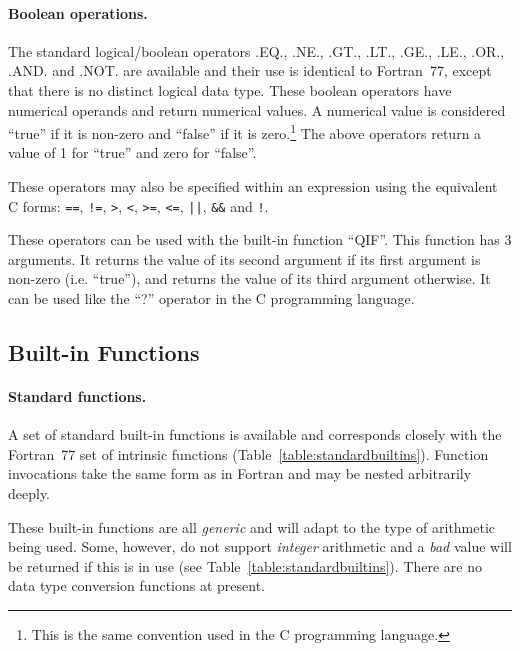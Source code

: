 \documentclass[twoside,11pt]{article}
\newcommand{\xlabel}[1]{}
\renewcommand{\_}{\texttt{\symbol{95}}}
\begin{document}
\paragraph{Boolean operations.}
The standard logical/boolean operators .EQ., .NE., .GT., .LT.,
.GE., .LE., .OR., .AND. and .NOT. are available and their use 
is identical to Fortran~77, except that there is no distinct logical data
type. These boolean operators have numerical operands and return numerical 
values. A numerical value is considered ``true'' if it is non-zero and 
``false'' if it is zero.\footnote{This is the same convention used in
the C programming language.} The above operators return a value of 1 for
``true'' and zero for ``false''.

These operators may also be specified within an expression using the
equivalent C forms:
\verb#==#,
\verb#!=#,
\verb#>#,
\verb#<#,
\verb#>=#,
\verb#<=#,
\verb#||#,
\verb#&&# and
\verb#!#.

These operators can be used with the built-in function ``QIF''. This
function has 3 arguments. It returns the value of its second argument if its 
first argument is non-zero (i.e. ``true''), and returns the value of its 
third argument otherwise. It can be used like the ``?'' operator in the C
programming language.

\subsection{\xlabel{builtin_functions}Built-in Functions}

\paragraph{Standard functions.}
A set of standard built-in functions is available and corresponds closely
with the Fortran~77 set of intrinsic functions
(Table~\ref{table:standardbuiltins}).
Function invocations take the same form as in Fortran and may be nested
arbitrarily deeply.

These built-in functions are all \emph{generic} and will adapt to the type of
arithmetic being used.
Some, however, do not support \emph{integer} arithmetic and a \emph{bad} value
will be returned if this is in use (see Table~\ref{table:standardbuiltins}).
There are no data type conversion functions at present.
\end{document}

